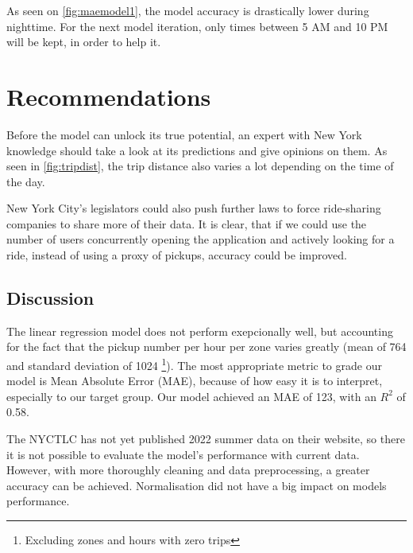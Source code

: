 \documentclass[11pt]{article}
\begin{document}
As seen on \autoref{fig:maemodel1}, the model accuracy is drastically lower during nighttime. For the next model iteration, only times between 5 AM and 10 PM will be kept, in order to help it. 

\section{Recommendations}

Before the model can unlock its true potential, an expert with New York knowledge should take a look at its predictions and give opinions on them. As seen in \autoref{fig:tripdist}, the trip distance also varies a lot depending on the time of the day.

New York City's legislators could also push further laws to force ride-sharing companies to share more of their data. It is clear, that if we could use the number of users concurrently opening the application and actively looking for a ride, instead of using a proxy of pickups, accuracy could be improved.

\subsection{Discussion} \label{discussion}

The linear regression model does not perform exepcionally well, but accounting for the fact that the pickup number per hour per zone varies greatly (mean of 764 and standard deviation of 1024 \footnote{Excluding zones and hours with zero trips}). The most appropriate metric to grade our model is Mean Absolute Error (MAE), because of how easy it is to interpret, especially to our target group. Our model achieved an MAE of 123, with an $R^2$ of 0.58.

The NYCTLC has not yet published 2022 summer data on their website, so there it is not possible to evaluate the model's performance with current data. However, with more thoroughly cleaning and data preprocessing, a greater accuracy can be achieved. Normalisation did not have a big impact on models performance.
\end{document}
